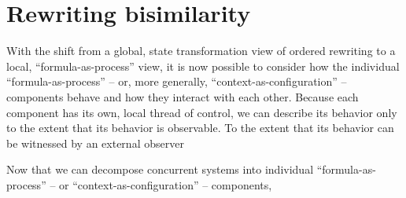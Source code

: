 
\section{Rewriting bisimilarity}\label{sec:ordered-bisimilarity:rewriting-bisimilarity}

With the shift from a global, state transformation view of ordered rewriting to a local, \enquote{formula-as-process} view, it is now possible to consider how the individual \enquote{formula-as-process} -- or, more generally, \enquote{context-as-configuration} -- components behave and how they interact with each other.
Because each component has its own, local thread of control, we can describe its behavior only to the extent that its behavior is observable.
To the extent that its behavior can be witnessed by an external observer

Now that we can decompose concurrent systems into individual \enquote{formula-as-process} -- or \enquote{context-as-configuration} -- components, 

